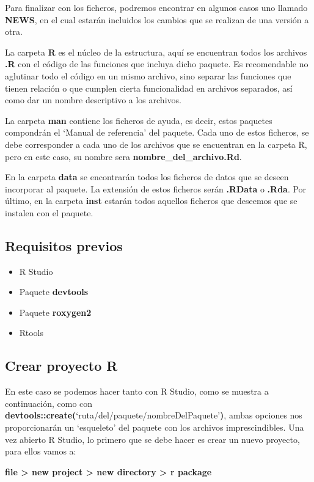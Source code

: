 Para finalizar con los ficheros, podremos encontrar en algunos casos uno llamado \textbf{NEWS}, en el cual estar\'an 
incluidos los cambios que se realizan de una versi\'on a otra.

La carpeta \textbf{R} es el n\'ucleo de la estructura, aqu\'i se encuentran todos los archivos \textbf{\textbf{.R}} con el c\'odigo de las funciones que incluya dicho paquete.
Es recomendable no aglutinar todo el c\'odigo en un mismo archivo, sino separar las funciones que tienen relaci\'on 
o que cumplen cierta funcionalidad en archivos separados, as\'i como dar un nombre descriptivo a los archivos.

La carpeta \textbf{man} contiene los ficheros de ayuda, es decir, estos paquetes compondr\'an el \enquote*{Manual de referencia} 
del paquete. Cada uno de estos ficheros, se debe corresponder a cada uno de los archivos que se encuentran 
en la carpeta R, pero en este caso, su nombre sera \textbf{nombre\_del\_archivo\textbf{.R}d}.

En la carpeta \textbf{data} se encontrar\'an todos los ficheros de datos que se deseen incorporar al paquete. La extensi\'on 
de estos ficheros ser\'an \textbf{\textbf{.R}Data} o \textbf{\textbf{.R}da}.
Por \'ultimo, en la carpeta \textbf{inst} estar\'an todos aquellos ficheros que deseemos que se instalen con el paquete.
\subsection{Requisitos previos}

\begin{itemize}
    \item R Studio
    \item Paquete \textbf{devtools}
    \item Paquete \textbf{\textbf{roxygen2}} 
    \item Rtools
\end{itemize}

\subsection{Crear proyecto R}

En este caso se podemos hacer tanto con R Studio, como se muestra a continuaci\'on,
como con \textbf{devtools::create(}\enquote*{ruta/del/paquete/nombreDelPaquete}\textbf{)}, ambas opciones nos
proporcionar\'an un \enquote*{esqueleto} del paquete con los archivos imprescindibles.
Una vez abierto R Studio, lo primero que se debe hacer es crear un nuevo proyecto, para
ellos vamos a: 
\begin{center}
    \textbf{file > new project > new directory > r package} 
\end{center}

